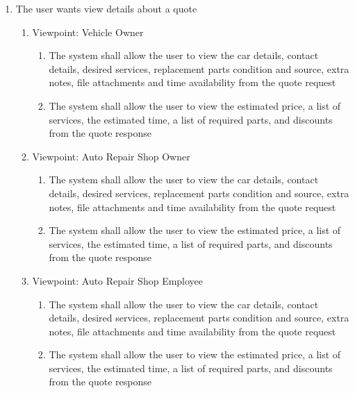 \documentclass[12pt]{article}
\begin{document}
\begin{enumerate}[resume*=business_events]
	\item The user wants view details about a quote
	      \begin{enumerate}[VP\arabic*.]
		      \item Viewpoint: Vehicle Owner
		            \begin{enumerate}
			            \item The system shall allow the user to view the car details, contact details, desired services,
			                  replacement parts condition and source, extra notes, file attachments and time availability from
			                  the quote request
			            \item The system shall allow the user to view the estimated price, a list of services, the estimated
			                  time, a list of required parts, and discounts from the quote response
		            \end{enumerate}
		      \item Viewpoint: Auto Repair Shop Owner
		            \begin{enumerate}
			            \item The system shall allow the user to view the car details, contact details, desired services,
			                  replacement parts condition and source, extra notes, file attachments and time availability from
			                  the quote request
			            \item The system shall allow the user to view the estimated price, a list of services, the estimated
			                  time, a list of required parts, and discounts from the quote response
		            \end{enumerate}
		      \item Viewpoint: Auto Repair Shop Employee
		            \begin{enumerate}
			            \item The system shall allow the user to view the car details, contact details, desired services,
			                  replacement parts condition and source, extra notes, file attachments and time availability from
			                  the quote request
			            \item The system shall allow the user to view the estimated price, a list of services, the estimated
			                  time, a list of required parts, and discounts from the quote response
		            \end{enumerate}
	      \end{enumerate}
\end{enumerate}
\end{document}
